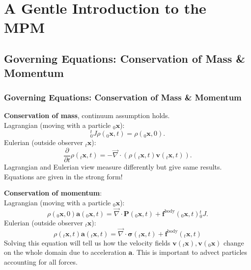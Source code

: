 \documentclass{beamer}
\let\oldcite=\cite
\renewcommand{\cite}[1]{\textcolor[rgb]{.55,.55,.89}{\oldcite{#1}}}
\begin{document}
\section{A Gentle Introduction to the MPM}


\subsection{Governing Equations: Conservation of Mass \& Momentum}

\begin{frame}
  \frametitle{Governing Equations: Conservation of Mass \& Momentum}
  \textbf{Conservation of mass}, continuum assumption holds.\\
  Lagrangian (moving with a particle ${}_0\boldsymbol{x}$):
  \begin{equation}
    {^t_0J}\rho(_0\boldsymbol{x},t) = {}\rho(_0\boldsymbol{x},0).
  \end{equation}
Eulerian (outside observer ${}_t\boldsymbol{x}$):
\begin{equation}
  \frac{\partial}{\partial t}\rho(_t\boldsymbol{x},t) = -  \vec{\nabla} \cdot (\rho(_t\boldsymbol{x},t) \boldsymbol{v}(_t\boldsymbol{x},t)).
\end{equation}
Lagrangian and Eulerian view measure differently but give same results. Equations are given in the strong form! \cite{MPM:COURSE}\cite{MIT:CONTINUUM_MECHANICS}
\end{frame}

\begin{frame}
  \textbf{Conservation of momentum}:\\
  Lagrangian (moving with a particle ${}_0\boldsymbol{x}$):
  \begin{equation}
  \rho(_0\boldsymbol{x},0)\boldsymbol{a}(_0\boldsymbol{x},t)
= \vec{\nabla} \cdot \boldsymbol{P}(_0\boldsymbol{x},t) + {\boldsymbol{f}} ^ {\text{body}}(_0\boldsymbol{x},t) {^t_0J}.
  \end{equation}
Eulerian (outside observer ${}_t\boldsymbol{x}$):
\begin{equation}
  \rho(_t\boldsymbol{x},t) \boldsymbol{a}(_t\boldsymbol{x},t) = \vec{\nabla} \cdot \boldsymbol{\sigma}(_t\boldsymbol{x},t) + \boldsymbol{f} ^ {\text{body}}(_t\boldsymbol{x},t)
\end{equation}
Solving this equation will tell us how the velocity fields $\boldsymbol{v}(_t\boldsymbol{x}),\boldsymbol{v}(_0\boldsymbol{x})$ change on the whole domain due to acceleration $\boldsymbol{a}$. This is important to advect particles accounting for all forces. \cite{MPM:COURSE}\cite{MIT:CONTINUUM_MECHANICS}
\end{frame}
\end{document}
